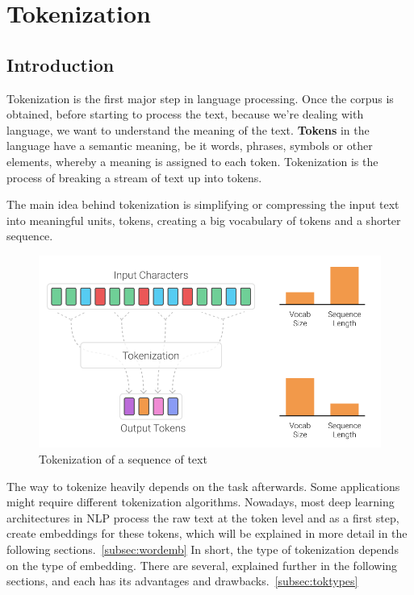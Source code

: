 %
%

\chapter{Tokenization}\label{sec:tokenization}

\section{Introduction}

Tokenization is the first major step in language processing. Once the corpus is obtained, before starting to process the text, because we're dealing with language, we want to understand the meaning of the text. \textbf{Tokens} in the language have a semantic meaning, be it words, phrases, symbols or other elements, whereby a meaning is assigned to each token. Tokenization is the process of breaking a stream of text up into tokens.~\cite{manning2008introduction}

The main idea behind tokenization is simplifying or compressing the input text into meaningful units, tokens, creating a big vocabulary of tokens and a shorter sequence.

\begin{figure}[!ht]
    \centering
    \includegraphics[width=12cm]{figures/tokenization.png}
    \caption{Tokenization of a sequence of text}
\end{figure}

The way to tokenize heavily depends on the task afterwards. Some applications might require different tokenization algorithms. Nowadays, most deep learning architectures in NLP process the raw text at the token level and as a first step, create embeddings for these tokens, which will be explained in more detail in the following sections.~\ref{subsec:wordemb} In short, the type of tokenization depends on the type of embedding. There are several, explained further in the following sections, and each has its advantages and drawbacks.~\ref{subsec:toktypes}


